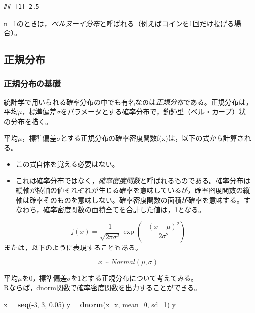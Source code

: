 \documentclass[]{article}
\newenvironment{Shaded}{\begin{snugshade}}{\end{snugshade}}
\newcommand{\KeywordTok}[1]{\textcolor[rgb]{0.13,0.29,0.53}{\textbf{#1}}}
\newcommand{\DataTypeTok}[1]{\textcolor[rgb]{0.13,0.29,0.53}{#1}}
\newcommand{\DecValTok}[1]{\textcolor[rgb]{0.00,0.00,0.81}{#1}}
\newcommand{\FloatTok}[1]{\textcolor[rgb]{0.00,0.00,0.81}{#1}}
\newcommand{\StringTok}[1]{\textcolor[rgb]{0.31,0.60,0.02}{#1}}
\newcommand{\OperatorTok}[1]{\textcolor[rgb]{0.81,0.36,0.00}{\textbf{#1}}}
\newcommand{\NormalTok}[1]{#1}
\begin{document}
\begin{verbatim}
## [1] 2.5
\end{verbatim}

n=1のときは，\emph{ベルヌーイ分布}と呼ばれる（例えばコインを1回だけ投げる場合）。

\subsection{正規分布}

\subsubsection{正規分布の基礎}

統計学で用いられる確率分布の中でも有名なのは\emph{正規分布}である。正規分布は，平均\(\mu\)，標準偏差\(\sigma\)をパラメータとする確率分布で，釣鐘型（ベル・カーブ）状の分布を描く。

平均\(\mu\)，標準偏差\(\sigma\)とする正規分布の確率密度関数f(x)は，以下の式から計算される。

\begin{itemize}
\item
  この式自体を覚える必要はない。
\item
  これは確率分布ではなく，\emph{確率密度関数}と呼ばれるものである。確率分布は縦軸が横軸の値それぞれが生じる確率を意味しているが，確率密度関数の縦軸は確率そのものを意味しない。確率密度関数の面積が確率を意味する。すなわち，確率密度関数の面積全てを合計した値は，1となる。
\end{itemize}

\[
f(x) = \frac{1}{\sqrt{2\pi\sigma^2}}\exp\left(-\frac{(x-\mu)^2}{2\sigma^2}\right)
\] または，以下のように表現することもある。

\[
x \sim Normal(\mu, \sigma)
\]

平均\(\mu\)を0，標準偏差\(\sigma\)を1とする正規分布について考えてみる。\\
Rならば，dnorm関数で確率密度関数を出力することができる。

\begin{Shaded}
\begin{Highlighting}[]
\NormalTok{x =}\StringTok{ }\KeywordTok{seq}\NormalTok{(}\OperatorTok{-}\DecValTok{3}\NormalTok{, }\DecValTok{3}\NormalTok{, }\FloatTok{0.05}\NormalTok{)}
\NormalTok{y =}\StringTok{ }\KeywordTok{dnorm}\NormalTok{(}\DataTypeTok{x=}\NormalTok{x, }\DataTypeTok{mean=}\DecValTok{0}\NormalTok{, }\DataTypeTok{sd=}\DecValTok{1}\NormalTok{)}
\NormalTok{y}
\end{Highlighting}
\end{Shaded}
\end{document}
